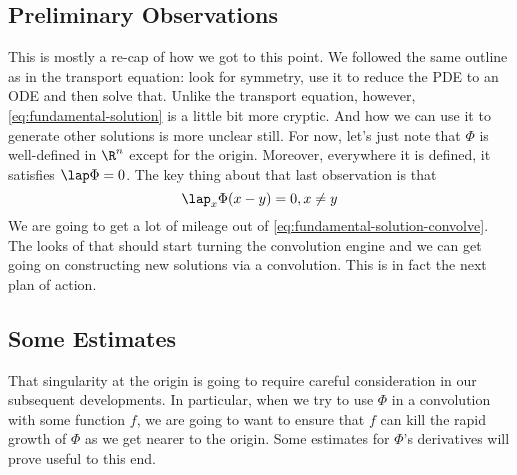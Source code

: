 \documentclass{bkcnotes}
\begin{document}
\subsection{Preliminary Observations}
This is mostly a re-cap of how we got to this point. We followed the
same outline as in the transport equation: look for symmetry, use it
to reduce the PDE to an ODE and then solve that. Unlike the transport
equation, however, \eqref{eq:fundamental-solution} is a little bit
more cryptic. And how we can use it to generate other solutions is
more unclear still. For now, let's just note that $\Phi$ is
well-defined in $\R^n$ except for the origin. Moreover, everywhere it
is defined, it satisfies $\lap \Phi = 0$. The key thing about that
last observation is that
\begin{equation}
  \label{eq:fundamental-solution-convolve}
  \lap_x\Phi(x-y) = 0, x\neq y
\end{equation}
We are going to get a lot of mileage out of
\eqref{eq:fundamental-solution-convolve}. The looks of that should
start turning the convolution engine and we can get going on
constructing new solutions via a convolution. This is in fact the next
plan of action.

\subsection{Some Estimates}
That singularity at the origin is going to require careful
consideration in our subsequent developments. In particular, when we
try to use $\Phi$ in a convolution with some function $f$, we are
going to want to ensure that $f$ can kill the rapid growth of $\Phi$
as we get nearer to the origin. Some estimates for $\Phi$'s
derivatives will prove useful to this end.
\end{document}
